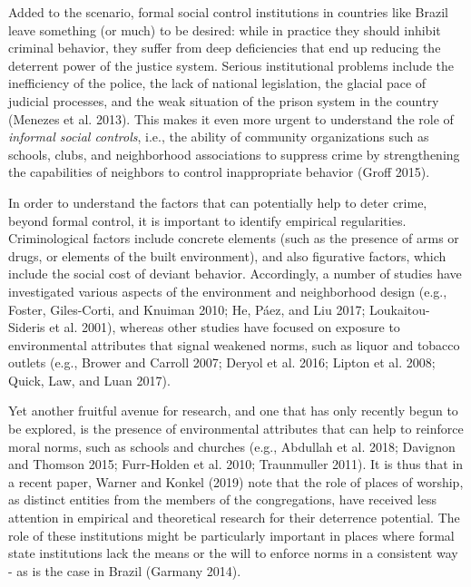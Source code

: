 \documentclass[smallextended]{svjour3}       %
\begin{document}
Added to the scenario, formal social control institutions in countries
like Brazil leave something (or much) to be desired: while in practice
they should inhibit criminal behavior, they suffer from deep
deficiencies that end up reducing the deterrent power of the justice
system. Serious institutional problems include the inefficiency of the
police, the lack of national legislation, the glacial pace of judicial
processes, and the weak situation of the prison system in the country
(Menezes et al. 2013). This makes it even more urgent to understand the
role of \emph{informal social controls}, i.e., the ability of community
organizations such as schools, clubs, and neighborhood associations to
suppress crime by strengthening the capabilities of neighbors to control
inappropriate behavior (Groff 2015).

In order to understand the factors that can potentially help to deter
crime, beyond formal control, it is important to identify empirical
regularities. Criminological factors include concrete elements (such as
the presence of arms or drugs, or elements of the built environment),
and also figurative factors, which include the social cost of deviant
behavior. Accordingly, a number of studies have investigated various
aspects of the environment and neighborhood design (e.g., Foster,
Giles-Corti, and Knuiman 2010; He, Páez, and Liu 2017; Loukaitou-Sideris
et al. 2001), whereas other studies have focused on exposure to
environmental attributes that signal weakened norms, such as liquor and
tobacco outlets (e.g., Brower and Carroll 2007; Deryol et al. 2016;
Lipton et al. 2008; Quick, Law, and Luan 2017).

Yet another fruitful avenue for research, and one that has only recently
begun to be explored, is the presence of environmental attributes that
can help to reinforce moral norms, such as schools and churches (e.g.,
Abdullah et al. 2018; Davignon and Thomson 2015; Furr-Holden et al.
2010; Traunmuller 2011). It is thus that in a recent paper, Warner and
Konkel (2019) note that the role of places of worship, as distinct
entities from the members of the congregations, have received less
attention in empirical and theoretical research for their deterrence
potential. The role of these institutions might be particularly
important in places where formal state institutions lack the means or
the will to enforce norms in a consistent way - as is the case in Brazil
(Garmany 2014).
\end{document}
